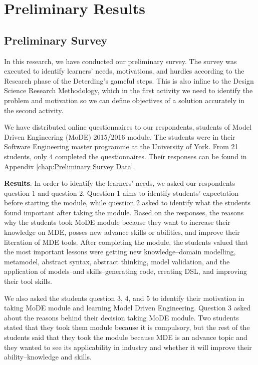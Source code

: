 \documentclass[12pt, a4paper]{report}
\begin{document}
\chapter{Preliminary Results}

\section{Preliminary Survey}
\label{Preliminary Survey}
In this research, we have conducted our preliminary survey. The survey was executed to identify learners' needs, motivations, and hurdles according to the Research phase of the Deterding's gameful steps. This is also inline to the Design Science Research Methodology, which in the first activity we need to identify the problem and motivation so we can define objectives of a solution accurately in the second activity. 

We have distributed online questionnaires to our respondents, students of Model Driven Engineering (MoDE) 2015/2016 module. The students were in their Software Engineering master programme at the University of York. From 21 students, only 4 completed the questionnaires. Their responses can be found in Appendix \autoref{chap:Preliminary Survey Data}.

\textbf{Results}. In order to identify the learners' needs, we asked our respondents question 1 and question 2. Question 1 aims to identify students' expectation before starting the module, while question 2 asked to identify what the students found important after taking the module. Based on the responses, the reasons why the students took MoDE module because they want to increase their knowledge on MDE, posses new advance skills or abilities, and improve their literation of MDE tools. After completing the module, the students valued that the most important lessons were getting new knowledge--domain modelling, metamodel, abstract syntax, abstract thinking, model validation, and the application of models--and skills--generating code, creating DSL, and improving their tool skills.   

We also asked the students question 3, 4, and 5 to identify their motivation in taking MoDE module and learning Model Driven Engineering.  Question 3 asked about the reasons behind their decision taking MoDE module. Two students stated that they took them module because it is compulsory, but the rest of the students said that they took the module because MDE is an advance topic and they wanted to see its applicability in industry and whether it will improve their ability--knowledge and skills. 
\end{document}
